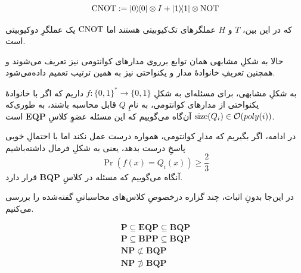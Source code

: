 \begin{equation}
    \CNOT := \dyad{0} \otimes I + \dyad{1} \otimes \NOT 
\end{equation} 

که در این بین، \(T\) و \(H\) عملگرهای تک‌کیوبیتی هستند اما  \(\operatorname{CNOT}\) یک عملگرِ دوکیوبیتی است.

حالا به شکلِ مشابهی همان توابع برروی مدارهای کوانتومی نیز تعریف می‌شوند و همچنین تعریفِ خانوادهٔ مدار و یکنواختی نیز به همین ترتیب تعمیم داده‌می‌شود.
 

به شکلِ مشابهی، برای مسئله‌ای به شکلِ 
\( f: \{ 0, 1\}^* \to \{ 0, 1\}\)
داریم 
که اگر با خانوادهٔ یکنواختی از مدارهای کوانتومی، به نامِ
\( Q \)
قابل محاسبه باشند، به طوری‌که 
\( \operatorname{size}(Q_i) \in \mathcal{O}(poly(i)) \) 
آن‌گاه می‌گوییم که این مسئله عضوِ کلاسِ
\( \mathbf{EQP} \)
است.

در ادامه، اگر بگیریم که مدارِ کوانتومی، همواره درست عمل نکند اما با احتمالِ خوبی پاسخِ درست بدهد، یعنی به شکلِ فرمال داشته‌باشیم
\begin{equation}
    \Pr(f(x) = Q_i(x)) \ge \frac{2}{3} 
\end{equation} 
آنگاه می‌گوییم که مسئله در کلاسِ
\( \mathbf{BQP} \)
قرار دارد.

در این‌جا بدونِ اثبات، چند گزاره درخصوصِ کلاس‌های محاسباتیِ گفته‌شده را بررسی می‌کنیم.

\begin{eqnarray}
    \mathbf{P} \subseteq \mathbf{EQP} \subseteq \mathbf{BQP} \\ 
    \mathbf{P} \subseteq \mathbf{BPP} \subseteq \mathbf{BQP} \\
    \mathbf{NP} \not\subset \mathbf{BQP} \\
    \mathbf{NP} \not\supset \mathbf{BQP}
\end{eqnarray}

